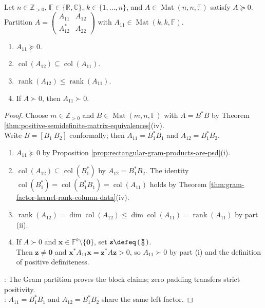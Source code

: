 \begin{corollary} \label{cor:positive-semidefinite-principal-block-column-inclusion} \\
Let $n\in\mathbb{Z}_{>0}$, $\mathbb{F}\in\{\mathbb{R},\mathbb{C}\}$, $k\in\{1,\ldots,n\}$, and $A\in\operatorname{Mat}(n,n,\mathbb{F})$ satisfy $A\succeq0$. Partition $A=\left(\begin{smallmatrix}A_{11}&A_{12}\\A_{12}^*&A_{22}\end{smallmatrix}\right)$ with $A_{11}\in\operatorname{Mat}(k,k,\mathbb{F})$.
\begin{enumerate}[label=(\roman*)]
\setlength{\itemsep}{0pt}
\item $A_{11}\succeq0$.
\item $\operatorname{col}(A_{12})\subseteq\operatorname{col}(A_{11})$.
\item $\operatorname{rank}(A_{12})\leq\operatorname{rank}(A_{11})$.
\item If $A\succ0$, then $A_{11}\succ0$.
\end{enumerate}
\begin{proof}
Choose $m\in\mathbb{Z}_{>0}$ and $B\in\operatorname{Mat}(m,n,\mathbb{F})$ with $A=B^*B$ by Theorem \ref{thm:positive-semidefinite-matrix-equivalences}(iv).\\
Write $B=[B_1\ B_2]$ conformally; then $A_{11}=B_1^*B_1$ and $A_{12}=B_1^*B_2$.
\begin{enumerate}[label=(\roman*)]
\setlength{\itemsep}{0pt}
\item $A_{11}\succeq0$ by Proposition \ref{prop:rectangular-gram-products-are-psd}(i).
\item $\operatorname{col}(A_{12})\subseteq\operatorname{col}(B_1^*)$ by $A_{12}=B_1^*B_2$. The identity $\operatorname{col}(B_1^*)=\operatorname{col}(B_1^*B_1)=\operatorname{col}(A_{11})$ holds by Theorem \ref{thm:gram-factor-kernel-rank-column-data}(iv).
\item $\operatorname{rank}(A_{12})=\dim\operatorname{col}(A_{12})\leq\dim\operatorname{col}(A_{11})=\operatorname{rank}(A_{11})$ by part (ii).
\item If $A\succ0$ and $\mathbf{x}\in\mathbb{F}^k\setminus\{\mathbf{0}\}$, set $\mathbf{z}\defeq\left(\begin{smallmatrix}\mathbf{x}\\\mathbf{0}\end{smallmatrix}\right)$.\\
Then $\mathbf{z}\neq\mathbf{0}$ and $\mathbf{x}^*A_{11}\mathbf{x}=\mathbf{z}^*A\mathbf{z}>0$, so $A_{11}\succ0$ by part (i) and the definition of positive definiteness.
\end{enumerate}
: The Gram partition proves the block claims; zero padding transfers strict positivity.\\
: $A_{11}=B_1^*B_1$ and $A_{12}=B_1^*B_2$ share the same left factor.
\end{proof}
\end{corollary}

